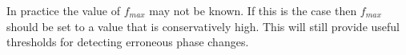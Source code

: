 \documentclass[a4paper]{IEEEtran}
\begin{document}
In practice the value of $f_{max}$ may not be known. If this is the case then $f_{max}$ should be set to a value that is conservatively high. This will still provide useful thresholds for detecting erroneous phase changes.
% 
\end{document}
